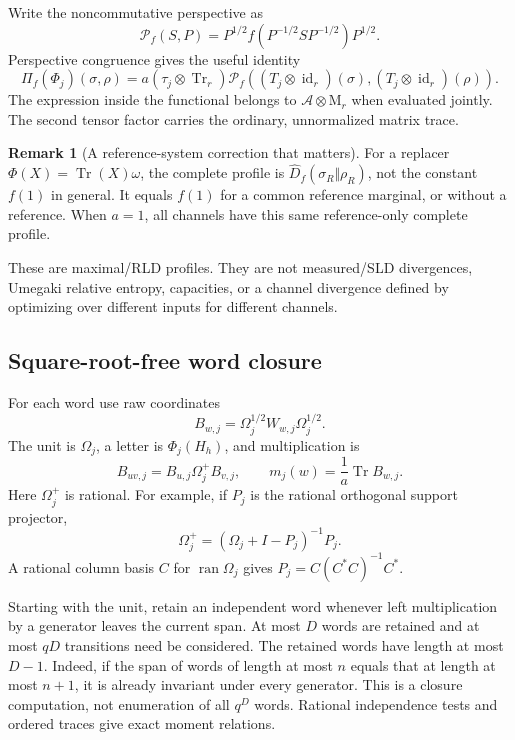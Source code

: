 \documentclass[11pt,a4paper]{article}
\theoremstyle{definition}\newtheorem{definition}[theorem]{Definition}
\newtheorem{remark}[theorem]{Remark}
\newcommand{\Tr}{\operatorname{Tr}}
\newcommand{\id}{\operatorname{id}}
\newcommand{\ran}{\operatorname{ran}}
\newcommand{\Alg}{\mathcal A}
\newcommand{\M}{\mathrm M}
\newcommand{\Dhat}{\widehat D}
\begin{document}
Write the noncommutative perspective as
\[
 \mathcal P_f(S,P)=P^{1/2}f(P^{-1/2}SP^{-1/2})P^{1/2}.
\]
Perspective congruence gives the useful identity
\begin{equation}\label{eq:perspective}
 \Pi_f(\Phi_j)(\sigma,\rho)
 =a(\tau_j\otimes\Tr_r)
 \mathcal P_f((T_j\otimes\id_r)(\sigma),(T_j\otimes\id_r)(\rho)).
\end{equation}
The expression inside the functional belongs to $\Alg\otimes\M_r$ when evaluated jointly. The second tensor factor carries the ordinary, unnormalized matrix trace.

\begin{remark}[A reference-system correction that matters]
For a replacer $\Phi(X)=\Tr(X)\omega$, the complete profile is
$\Dhat_f(\sigma_R\Vert\rho_R)$, not the constant $f(1)$ in general. It equals $f(1)$ for a common reference marginal, or without a reference. When $a=1$, all channels have this same reference-only complete profile.
\end{remark}

These are maximal/RLD profiles. They are not measured/SLD divergences, Umegaki relative entropy, capacities, or a channel divergence defined by optimizing over different inputs for different channels.

\subsection{Square-root-free word closure}

For each word use raw coordinates
\[
 B_{w,j}=\Omega_j^{1/2}W_{w,j}\Omega_j^{1/2}.
\]
The unit is $\Omega_j$, a letter is $\Phi_j(H_h)$, and multiplication is
\begin{equation}\label{eq:rawproduct}
 B_{uv,j}=B_{u,j}\Omega_j^+B_{v,j},\qquad
 m_j(w)=\frac1a\Tr B_{w,j}.
\end{equation}
Here $\Omega_j^+$ is rational. For example, if $P_j$ is the rational orthogonal support projector,
\[
 \Omega_j^+=(\Omega_j+I-P_j)^{-1}P_j.
\]
A rational column basis $C$ for $\ran\Omega_j$ gives $P_j=C(C^*C)^{-1}C^*$.

Starting with the unit, retain an independent word whenever left multiplication by a generator leaves the current span. At most $D$ words are retained and at most $qD$ transitions need be considered. The retained words have length at most $D-1$. Indeed, if the span of words of length at most $n$ equals that at length at most $n+1$, it is already invariant under every generator. This is a closure computation, not enumeration of all $q^{D}$ words. Rational independence tests and ordered traces give exact moment relations.
\end{document}
